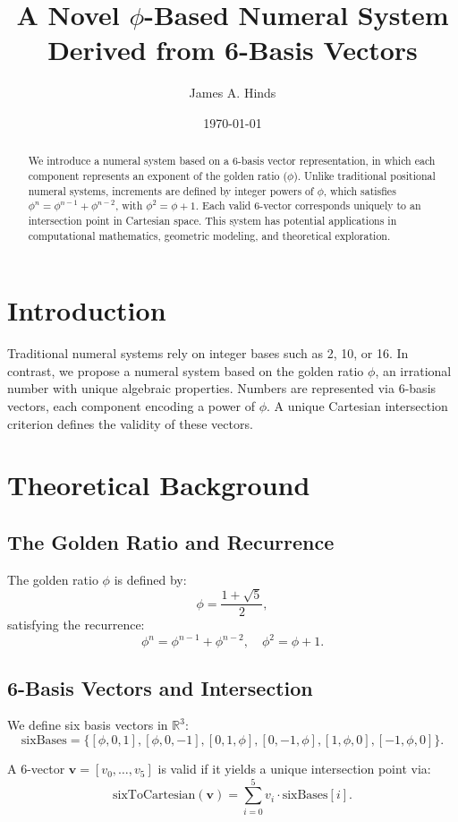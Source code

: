 \documentclass{article}
\title{A Novel $\phi$-Based Numeral System Derived from 6-Basis Vectors}
\author{James A. Hinds}
\date{\today}
\begin{document}
\maketitle

\begin{abstract}
We introduce a numeral system based on a 6-basis vector representation, in which each component represents an exponent of the golden ratio ($\phi$). Unlike traditional positional numeral systems, increments are defined by integer powers of $\phi$, which satisfies $\phi^n = \phi^{n-1} + \phi^{n-2}$, with $\phi^2 = \phi + 1$. Each valid 6-vector corresponds uniquely to an intersection point in Cartesian space. This system has potential applications in computational mathematics, geometric modeling, and theoretical exploration.
\end{abstract}

\section{Introduction}
Traditional numeral systems rely on integer bases such as 2, 10, or 16. In contrast, we propose a numeral system based on the golden ratio $\phi$, an irrational number with unique algebraic properties. Numbers are represented via 6-basis vectors, each component encoding a power of $\phi$. A unique Cartesian intersection criterion defines the validity of these vectors.

\section{Theoretical Background}

\subsection{The Golden Ratio and Recurrence}
The golden ratio $\phi$ is defined by:
\[
\phi = \frac{1 + \sqrt{5}}{2},
\]
satisfying the recurrence:
\[
\phi^n = \phi^{n-1} + \phi^{n-2}, \quad \phi^2 = \phi + 1.
\]

\subsection{6-Basis Vectors and Intersection}
We define six basis vectors in $\mathbb{R}^3$:
\[
\text{sixBases} = \{[\phi,0,1], [\phi,0,-1], [0,1,\phi], [0,-1,\phi], [1,\phi,0], [-1,\phi,0]\}.
\]

A 6-vector $\mathbf{v} = [v_0, \dots, v_5]$ is valid if it yields a unique intersection point via:
\[
\text{sixToCartesian}(\mathbf{v}) = \sum_{i=0}^{5} v_i \cdot \text{sixBases}[i].
\]
\end{document}
